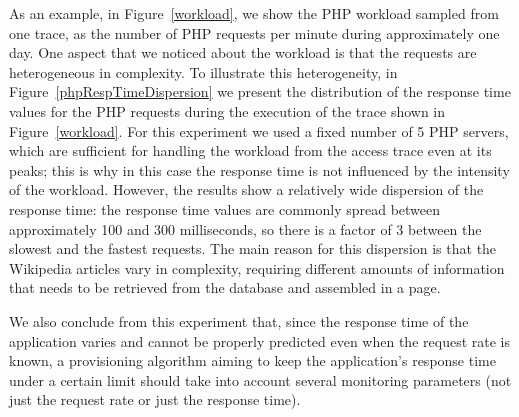 As an example, in Figure~\ref{workload}, we show the PHP workload 
sampled from one trace, as the number of PHP requests per minute 
during approximately one day. One aspect that we noticed about the 
workload is that the requests are heterogeneous in complexity.
To illustrate this heterogeneity, in Figure~\ref{phpRespTimeDispersion}
we present the distribution of the response time values for the PHP 
requests during the execution of the trace shown in Figure~\ref{workload}.
For this experiment we used a fixed number of 5 PHP servers,
which are sufficient for handling the workload from the access 
trace even at its peaks; this is why in this case the response 
time is not influenced by the intensity of the workload.  
However, the results show a relatively wide 
dispersion of the response time: the response time values are 
commonly spread between approximately 100 and 300 milliseconds, 
so there is a factor of 3 between the slowest and the fastest requests. 
The main reason for this dispersion is that the Wikipedia articles 
vary in complexity, requiring different amounts of information that
needs to be retrieved from the database and assembled in a page. 


We also conclude from this experiment that, since the response time of the application varies and cannot be properly predicted even when the request rate is known, 
a provisioning algorithm aiming to keep the application's response time 
under a certain limit should take into account several monitoring 
parameters (not just the request rate or just the response time).








